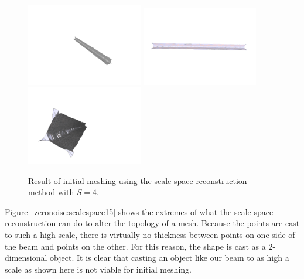\documentclass[12pt]{drexelthesis}
\begin{document}
\begin{figure}[!ht]
	\centering
		\includegraphics[trim={5in 2in 3in 3in},clip,width=2in]{simulated-lab-scan/0noise/clean/scalespace400.png}
		\includegraphics[width=2in]{simulated-lab-scan/0noise/clean/scalespace401.png}
		\includegraphics[trim={0.5in 1in 2in 2in}, clip, width=2in]{simulated-lab-scan/0noise/clean/scalespace402.png}
		\caption[Initial meshing using a scale space reconstruction with $S = 4$]{\centering  Result of initial meshing using the scale space reconstruction method with $S = 4$.}
		\label{zeronoise:scalespace4}
\end{figure}

Figure~\ref{zeronoise:scalespace15} shows the extremes of what the scale space reconstruction can do to alter the topology of a mesh. Because the points are cast to such a high scale, there is virtually no thickness between points on one side of the beam and points on the other. For this reason, the shape is cast as a 2-dimensional object. It is clear that casting an object like our beam to as high a scale as shown here is not viable for initial meshing. 
\end{document}
